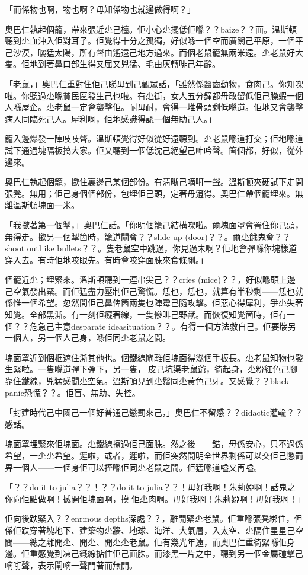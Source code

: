 「而係物也啊，物也啊？毋知係物也就邊做得啊？」

奧巴仁執起個籠，帶來張近尐己檯。佢小心尐擺低佢喺？？baize？？面。溫斯頓聽到尐血沖入佢對耳子。佢覺得十分之孤獨，好似喺一個空而廣闊己平原，一個平己沙漠，曬猛太陽，所有聲由遙遠己地方過來。而個老鼠籠無兩米遠。尐老鼠好大隻。佢地到著鼻口部生得又屈又兇猛、毛由灰轉啡己年齡。

「老鼠，」奧巴仁重對住佢己睇毋到己觀眾話，「雖然係齧齒動物，食肉己。你知㗎啦。你聽過尐喺貧民區發生己也啦。有尐街，女人五分鐘都毋敢留低佢己臊蝦一個人喺屋企。尐老鼠一定會襲擊佢。耐毋耐，會得一堆骨頭剩低喺道。佢地又會襲擊病人同臨死己人。犀利啊，佢地感識得認一個無助己人。」

籠入邊爆發一陣吱吱聲。溫斯頓覺得好似從好遠聽到。尐老鼠喺道打交；佢地喺道試下通過塊隔板搞大家。佢又聽到一個低沈己絕望己呻吟聲。箇個都，好似，從外邊來。

奧巴仁執起個籠，撳住裏邊己某個部份。有淸晰己嘀咑一聲。溫斯頓夾硬試下走開張凳。無用；佢己身個個部份，包埋佢己頭，定著毋逳得。奧巴仁帶個籠埋來。無離溫斯頓塊面一米。

「我撳著第一個掣，」奧巴仁話。「你明個籠己結構㗎啦。爾塊面罩會罯住你己頭，無得走。撳另一個掣箇時，籠道閘會？？slide up (door)？？。爾尐餓鬼會？？shoot outl ike bullets？？。隻老鼠空中跳過，你見過未啊？佢地會彈喺你塊樣道穿入去。有時佢地咬眼先。有時會咬穿面䏭來食條脷。」

個籠近尐；埋緊來。溫斯頓聽到一連串尖己？？cries (mice)？？，好似喺頭上邊己空氣發出緊。而佢猛盡力壓制佢己驚慌。恁也，恁也，就算有半秒剩——恁也就係惟一個希望。忽然間佢己鼻俾箇兩隻也陣霉己隨攻擊。佢惡心得犀利，爭尐失著知覺。全部黑澌。有一刻佢癡著線，一隻慘叫己野獸。而恢復知覺箇時，佢有一個？？危急己主意desparate ideasituation？？。有得一個方法救自己。佢要𤗈另一個人，另一個人己身，喺佢同尐老鼠之間。

塊面罩近到個框遮住澌其他也。個鐵線閘離佢塊面得幾個手板長。尐老鼠知物也發生緊啦。一隻喺道彈下彈下，另一隻，𠞉皮己坑渠老鼠爺，徛起身，尐粉紅色己腳靠住鐵線，兇猛感聞尐空氣。溫斯頓見到尐鬚同尐黃色己牙。又感覺？？black panic恐慌？？。佢盲、無助、失控。

「封建時代己中國己一個好普通己懲罰來己，」奧巴仁不留感？？didactic灌輸？？感話。

塊面罩埋緊來佢塊面。尐鐵線擦過佢己面䏭。然之後——錯，毋係安心，只不過係希望，一尐尐希望。遲啦，或者，遲啦，而佢突然間明全世界剩係可以交佢己懲罰畀一個人——一個身佢可以挃喺佢同尐老鼠之間。佢猛喺道嗌又再嗌。

「？？do it to julia？？！？？do it to julia？？！毋好我啊！朱莉婭啊！話鬼之你向佢點做啊！搣開佢塊面啊，摸𠞉佢尐肉啊。毋好我啊！朱莉婭啊！毋好我啊！」

佢向後跌緊入？？enrmous depths深處？？，離開緊尐老鼠。佢重喺張凳綁住，但係佢跌穿著塊地下、建築物尐牆、地球、海洋、大氣層，入太空、尐隔住星星己空間——總之離開尐、開尐、開尐尐老鼠。佢有幾光年遠，而奧巴仁重徛緊喺佢身邊。佢重感覺到凍己鐵線掂住佢己面䏭。而漆黑一片之中，聽到另一個金屬碰擊己嘀咑聲，表示閘嘀一聲閂著而無開。
